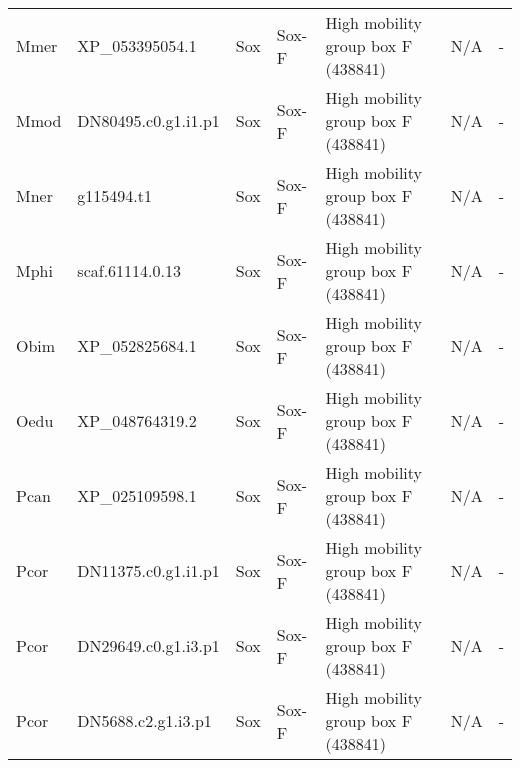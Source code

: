 \documentclass[../main.tex]{subfiles}
\begin{document}
\begin{landscape}
\begin{longtable}{lllllll}
		Mmer           & XP\_053395054.1       & Sox            & Sox-F               & High mobility group box F (438841)          & N/A                                                                    & -                    \\
		Mmod           & DN80495.c0.g1.i1.p1   & Sox            & Sox-F               & High mobility group box F (438841)          & N/A                                                                    & -                    \\
		Mner           & g115494.t1            & Sox            & Sox-F               & High mobility group box F (438841)          & N/A                                                                    & -                    \\
		Mphi           & scaf.61114.0.13       & Sox            & Sox-F               & High mobility group box F (438841)          & N/A                                                                    & -                    \\
		Obim           & XP\_052825684.1       & Sox            & Sox-F               & High mobility group box F (438841)          & N/A                                                                    & -                    \\
		Oedu           & XP\_048764319.2       & Sox            & Sox-F               & High mobility group box F (438841)          & N/A                                                                    & -                    \\
		Pcan           & XP\_025109598.1       & Sox            & Sox-F               & High mobility group box F (438841)          & N/A                                                                    & -                    \\
		Pcor           & DN11375.c0.g1.i1.p1   & Sox            & Sox-F               & High mobility group box F (438841)          & N/A                                                                    & -                    \\
		Pcor           & DN29649.c0.g1.i3.p1   & Sox            & Sox-F               & High mobility group box F (438841)          & N/A                                                                    & -                    \\
		Pcor           & DN5688.c2.g1.i3.p1    & Sox            & Sox-F               & High mobility group box F (438841)          & N/A                                                                    & -                    \\

\end{longtable}
\end{landscape}
\end{document}
